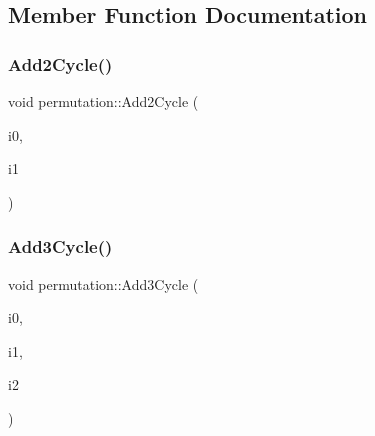 \subsection{Member Function Documentation}
\mbox{\label{classpermutation_a1e3b6593fab78625b620820e0d61f1e0}} 
\subsubsection{\texorpdfstring{Add2\+Cycle()}{Add2Cycle()}}
{\footnotesize\ttfamily void permutation\+::\+Add2\+Cycle (\begin{DoxyParamCaption}\item[{\mbox{\hyperlink{galois_8h_a09fddde158a3a20bd2dcadb609de11dc}{I\+NT}}}]{i0,  }\item[{\mbox{\hyperlink{galois_8h_a09fddde158a3a20bd2dcadb609de11dc}{I\+NT}}}]{i1 }\end{DoxyParamCaption})}

\mbox{\label{classpermutation_a89f7abdb4b6898acdc4f0425905dcf5f}} 
\subsubsection{\texorpdfstring{Add3\+Cycle()}{Add3Cycle()}}
{\footnotesize\ttfamily void permutation\+::\+Add3\+Cycle (\begin{DoxyParamCaption}\item[{\mbox{\hyperlink{galois_8h_a09fddde158a3a20bd2dcadb609de11dc}{I\+NT}}}]{i0,  }\item[{\mbox{\hyperlink{galois_8h_a09fddde158a3a20bd2dcadb609de11dc}{I\+NT}}}]{i1,  }\item[{\mbox{\hyperlink{galois_8h_a09fddde158a3a20bd2dcadb609de11dc}{I\+NT}}}]{i2 }\end{DoxyParamCaption})}

\mbox{\label{classpermutation_abe736e092eae50dfac474a510e51125f}} 
